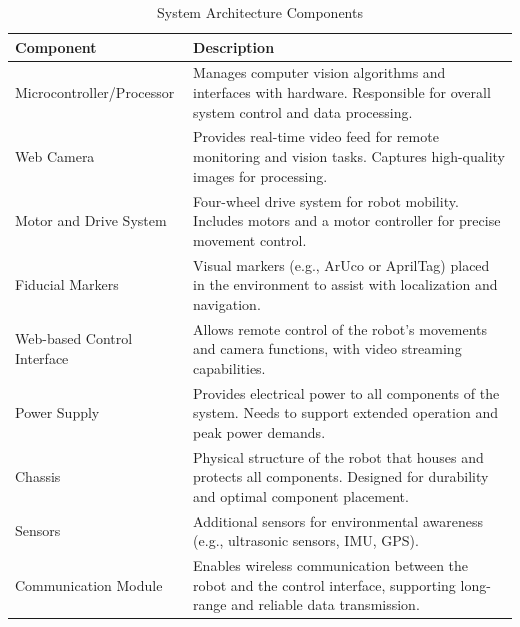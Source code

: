 \begin{table}[ht]
\centering
\caption{System Architecture Components}
\label{tab:system_architecture}
\begin{tabular}{|p{5cm}|p{10cm}|}
\hline
\textbf{Component} & \textbf{Description} \\ \hline
Microcontroller/Processor & Manages computer vision algorithms and interfaces with hardware. Responsible for overall system control and data processing. \\ \hline
Web Camera & Provides real-time video feed for remote monitoring and vision tasks. Captures high-quality images for processing. \\ \hline
Motor and Drive System & Four-wheel drive system for robot mobility. Includes motors and a motor controller for precise movement control.\\ \hline
Fiducial Markers & Visual markers (e.g., ArUco or AprilTag) placed in the environment to assist with localization and navigation.\\ \hline
Web-based Control Interface & Allows remote control of the robot’s movements and camera functions, with video streaming capabilities. \\ \hline
Power Supply & Provides electrical power to all components of the system. Needs to support extended operation and peak power demands. \\ \hline
Chassis & Physical structure of the robot that houses and protects all components. Designed for durability and optimal component placement.  \\ \hline
Sensors & Additional sensors for environmental awareness (e.g., ultrasonic sensors, IMU, GPS).\\  \hline
Communication Module & Enables wireless communication between the robot and the control interface, supporting long-range and reliable data transmission. \\ \hline
\end{tabular}
\end{table}
